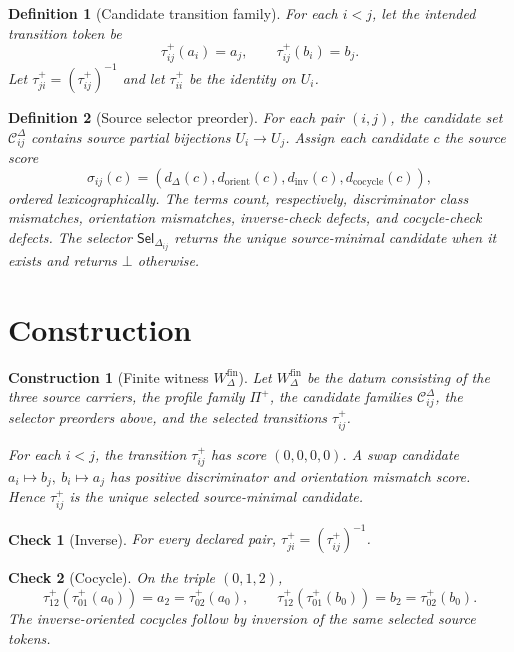\documentclass[11pt]{article}
\newcommand{\Prof}{\Pi^{+}}
\newcommand{\Cand}{\mathcal{C}^{\Delta}}
\newcommand{\Sel}{\mathsf{Sel}_{\Delta}}
\newcommand{\Bot}{\bot}
\newcommand{\Wfin}{W_{\Delta}^{\mathrm{fin}}}
\newtheorem{definition}{Definition}
\newtheorem{construction}{Construction}
\newtheorem{checkresult}{Check}
\begin{document}
\begin{definition}[Candidate transition family]
For each \(i<j\), let the intended transition token be
\[
\tau_{ij}^{+}(a_i)=a_j,\qquad \tau_{ij}^{+}(b_i)=b_j.
\]
Let \(\tau_{ji}^{+}=(\tau_{ij}^{+})^{-1}\) and let
\(\tau_{ii}^{+}\) be the identity on \(U_i\).
\end{definition}

\begin{definition}[Source selector preorder]
For each pair \((i,j)\), the candidate set \(\Cand_{ij}\) contains source
partial bijections \(U_i\to U_j\). Assign each candidate \(c\) the source
score
\[
\sigma_{ij}(c)=
(d_{\Delta}(c),d_{\mathrm{orient}}(c),d_{\mathrm{inv}}(c),
d_{\mathrm{cocycle}}(c)),
\]
ordered lexicographically. The terms count, respectively, discriminator class
mismatches, orientation mismatches, inverse-check defects, and cocycle-check
defects. The selector \(\Sel_{ij}\) returns the unique source-minimal
candidate when it exists and returns \(\Bot\) otherwise.
\end{definition}

\section{Construction}

\begin{construction}[Finite witness \(\Wfin\)]
Let \(\Wfin\) be the datum consisting of the three source carriers, the
profile family \(\Prof\), the candidate families \(\Cand_{ij}\), the selector
preorders above, and the selected transitions \(\tau_{ij}^{+}\).

For each \(i<j\), the transition \(\tau_{ij}^{+}\) has score
\((0,0,0,0)\). A swap candidate \(a_i\mapsto b_j,\ b_i\mapsto a_j\) has
positive discriminator and orientation mismatch score. Hence
\(\tau_{ij}^{+}\) is the unique selected source-minimal candidate.
\end{construction}

\begin{checkresult}[Inverse]
For every declared pair, \(\tau_{ji}^{+}=(\tau_{ij}^{+})^{-1}\).
\end{checkresult}

\begin{checkresult}[Cocycle]
On the triple \((0,1,2)\),
\[
\tau_{12}^{+}(\tau_{01}^{+}(a_0))=a_2=\tau_{02}^{+}(a_0),
\qquad
\tau_{12}^{+}(\tau_{01}^{+}(b_0))=b_2=\tau_{02}^{+}(b_0).
\]
The inverse-oriented cocycles follow by inversion of the same selected source
tokens.
\end{checkresult}
\end{document}
